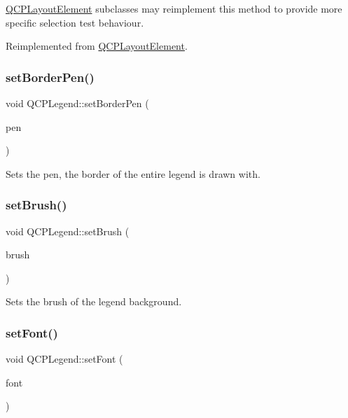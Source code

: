 \mbox{\hyperlink{class_q_c_p_layout_element}{Q\+C\+P\+Layout\+Element}} subclasses may reimplement this method to provide more specific selection test behaviour. 

Reimplemented from \mbox{\hyperlink{class_q_c_p_layout_element_ae97f483cccedadbf18ea4525ef240ee4}{Q\+C\+P\+Layout\+Element}}.

\mbox{\label{class_q_c_p_legend_a866a9e3f5267de7430a6c7f26a61db9f}} 
\subsubsection{\texorpdfstring{set\+Border\+Pen()}{setBorderPen()}}
{\footnotesize\ttfamily void Q\+C\+P\+Legend\+::set\+Border\+Pen (\begin{DoxyParamCaption}\item[{const Q\+Pen \&}]{pen }\end{DoxyParamCaption})}

Sets the pen, the border of the entire legend is drawn with. \mbox{\label{class_q_c_p_legend_a497bbcd38baa3598c08e2b3f48103f23}} 
\subsubsection{\texorpdfstring{set\+Brush()}{setBrush()}}
{\footnotesize\ttfamily void Q\+C\+P\+Legend\+::set\+Brush (\begin{DoxyParamCaption}\item[{const Q\+Brush \&}]{brush }\end{DoxyParamCaption})}

Sets the brush of the legend background. \mbox{\label{class_q_c_p_legend_aa4cda8499e3cb0f3be415edc02984c73}} 
\subsubsection{\texorpdfstring{set\+Font()}{setFont()}}
{\footnotesize\ttfamily void Q\+C\+P\+Legend\+::set\+Font (\begin{DoxyParamCaption}\item[{const Q\+Font \&}]{font }\end{DoxyParamCaption})}

